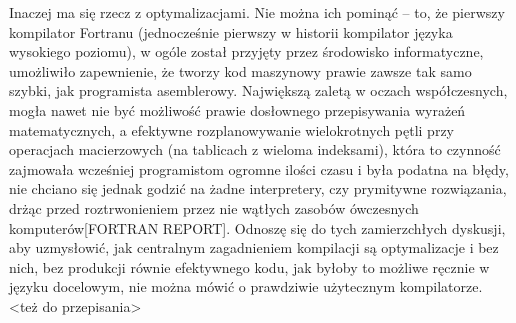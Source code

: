 Inaczej ma się rzecz z optymalizacjami. Nie można ich pominąć – to, że pierwszy kompilator Fortranu (jednocześnie pierwszy w historii kompilator języka wysokiego poziomu), w ogóle został przyjęty przez środowisko informatyczne, umożliwiło zapewnienie, że tworzy kod maszynowy prawie zawsze tak samo szybki, jak programista asemblerowy. Największą zaletą w oczach współczesnych, mogła nawet nie być możliwość prawie dosłownego przepisywania wyrażeń matematycznych, a efektywne rozplanowywanie wielokrotnych pętli przy operacjach macierzowych (na tablicach z wieloma indeksami), która to czynność zajmowała wcześniej programistom ogromne ilości czasu i była podatna na błędy, nie chciano się jednak godzić na żadne interpretery, czy prymitywne rozwiązania, drżąc przed roztrwonieniem przez nie wątłych zasobów ówczesnych komputerów[FORTRAN REPORT].
Odnoszę się do tych zamierzchłych dyskusji, aby uzmysłowić, jak centralnym zagadnieniem kompilacji są optymalizacje i bez nich, bez produkcji równie efektywnego kodu, jak byłoby to możliwe ręcznie w języku docelowym, nie można mówić o prawdziwie użytecznym  kompilatorze.
<też do przepisania>


